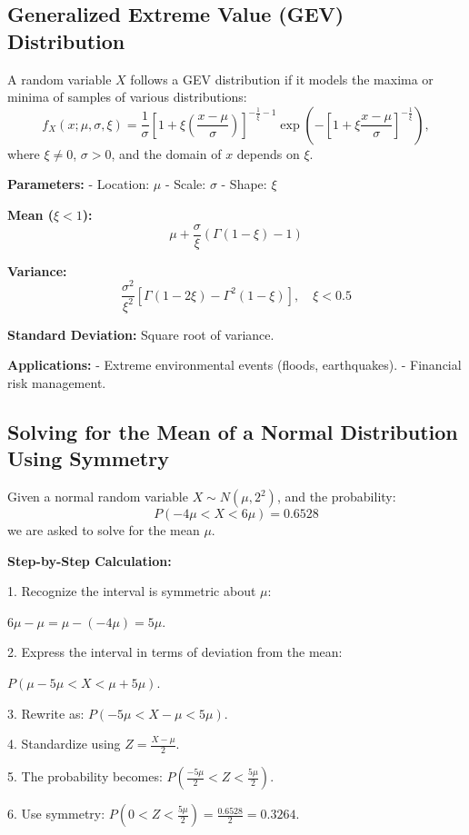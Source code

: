 \documentclass{article}
\begin{document}
\begin{multicols}{2}
\subsection*{Generalized Extreme Value (GEV) Distribution}
A random variable \(X\) follows a GEV distribution if it models the maxima or minima of samples of various distributions:
\[
f_X(x; \mu, \sigma, \xi) = \frac{1}{\sigma} \left[1 + \xi \left(\frac{x - \mu}{\sigma}\right)\right]^{-\frac{1}{\xi} - 1} \exp\left(-\left[1 + \xi \frac{x - \mu}{\sigma}\right]^{-\frac{1}{\xi}}\right),
\]
where \(\xi \neq 0\), \(\sigma > 0\), and the domain of \(x\) depends on \(\xi\).

\textbf{Parameters:}
- Location: \(\mu\)
- Scale: \(\sigma\)
- Shape: \(\xi\)

\textbf{Mean (\(\xi < 1\)):}
\[
\mu + \frac{\sigma}{\xi}(\Gamma(1-\xi) - 1)
\]

\textbf{Variance:}
\[
\frac{\sigma^2}{\xi^2}[\Gamma(1 - 2\xi) - \Gamma^2(1 - \xi)], \quad \xi < 0.5
\]

\textbf{Standard Deviation:} Square root of variance.

\textbf{Applications:}
- Extreme environmental events (floods, earthquakes).
- Financial risk management.

\subsection*{Solving for the Mean of a Normal Distribution Using Symmetry}

Given a normal random variable \( X \sim N(\mu, 2^2) \), and the probability:
\[
P(-4\mu < X < 6\mu) = 0.6528
\]
we are asked to solve for the mean \( \mu \).

\textbf{Step-by-Step Calculation:}

1. Recognize the interval is symmetric about \( \mu \):

\quad\quad\( 6\mu - \mu = \mu - (-4\mu) = 5\mu \).

2. Express the interval in terms of deviation from the mean:

\quad\quad\( P(\mu - 5\mu < X < \mu + 5\mu) \).

3. Rewrite as: \( P(-5\mu < X - \mu < 5\mu) \).

4. Standardize using \( Z = \frac{X - \mu}{2} \).

5. The probability becomes: \( P\left( \frac{-5\mu}{2} < Z < \frac{5\mu}{2} \right) \).

6. Use symmetry: \( P\left( 0 < Z < \frac{5\mu}{2} \right) = \frac{0.6528}{2} = 0.3264 \).


\end{multicols}
\end{document}
